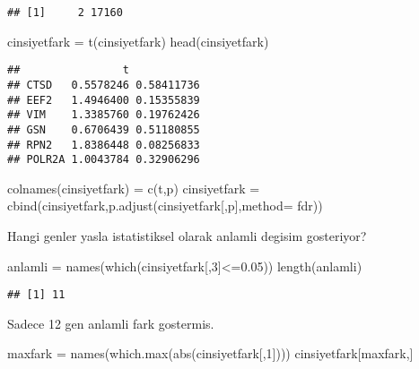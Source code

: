 \documentclass[
]{book}
\newenvironment{Shaded}{\begin{snugshade}}{\end{snugshade}}
\newcommand{\AttributeTok}[1]{\textcolor[rgb]{0.77,0.63,0.00}{#1}}
\newcommand{\DecValTok}[1]{\textcolor[rgb]{0.00,0.00,0.81}{#1}}
\newcommand{\FloatTok}[1]{\textcolor[rgb]{0.00,0.00,0.81}{#1}}
\newcommand{\FunctionTok}[1]{\textcolor[rgb]{0.00,0.00,0.00}{#1}}
\newcommand{\NormalTok}[1]{#1}
\newcommand{\OtherTok}[1]{\textcolor[rgb]{0.56,0.35,0.01}{#1}}
\newcommand{\SpecialCharTok}[1]{\textcolor[rgb]{0.00,0.00,0.00}{#1}}
\newcommand{\StringTok}[1]{\textcolor[rgb]{0.31,0.60,0.02}{#1}}
\begin{document}
\begin{verbatim}
## [1]     2 17160
\end{verbatim}

\begin{Shaded}
\begin{Highlighting}[]
\NormalTok{cinsiyetfark }\OtherTok{=} \FunctionTok{t}\NormalTok{(cinsiyetfark)}
\FunctionTok{head}\NormalTok{(cinsiyetfark)}
\end{Highlighting}
\end{Shaded}

\begin{verbatim}
##                t           
## CTSD   0.5578246 0.58411736
## EEF2   1.4946400 0.15355839
## VIM    1.3385760 0.19762426
## GSN    0.6706439 0.51180855
## RPN2   1.8386448 0.08256833
## POLR2A 1.0043784 0.32906296
\end{verbatim}

\begin{Shaded}
\begin{Highlighting}[]
\FunctionTok{colnames}\NormalTok{(cinsiyetfark) }\OtherTok{=} \FunctionTok{c}\NormalTok{(}\StringTok{\textquotesingle{}t\textquotesingle{}}\NormalTok{,}\StringTok{\textquotesingle{}p\textquotesingle{}}\NormalTok{)}
\NormalTok{cinsiyetfark }\OtherTok{=} \FunctionTok{cbind}\NormalTok{(cinsiyetfark,}\FunctionTok{p.adjust}\NormalTok{(cinsiyetfark[,}\StringTok{\textquotesingle{}p\textquotesingle{}}\NormalTok{],}\AttributeTok{method=} \StringTok{\textquotesingle{}fdr\textquotesingle{}}\NormalTok{))}
\end{Highlighting}
\end{Shaded}

Hangi genler yasla istatistiksel olarak anlamli degisim gosteriyor?

\begin{Shaded}
\begin{Highlighting}[]
\NormalTok{anlamli }\OtherTok{=} \FunctionTok{names}\NormalTok{(}\FunctionTok{which}\NormalTok{(cinsiyetfark[,}\DecValTok{3}\NormalTok{]}\SpecialCharTok{\textless{}=}\FloatTok{0.05}\NormalTok{))}
\FunctionTok{length}\NormalTok{(anlamli)}
\end{Highlighting}
\end{Shaded}

\begin{verbatim}
## [1] 11
\end{verbatim}

Sadece 12 gen anlamli fark gostermis.

\begin{Shaded}
\begin{Highlighting}[]
\NormalTok{maxfark }\OtherTok{=} \FunctionTok{names}\NormalTok{(}\FunctionTok{which.max}\NormalTok{(}\FunctionTok{abs}\NormalTok{(cinsiyetfark[,}\DecValTok{1}\NormalTok{])))}
\NormalTok{cinsiyetfark[maxfark,]}
\end{Highlighting}
\end{Shaded}
\end{document}
